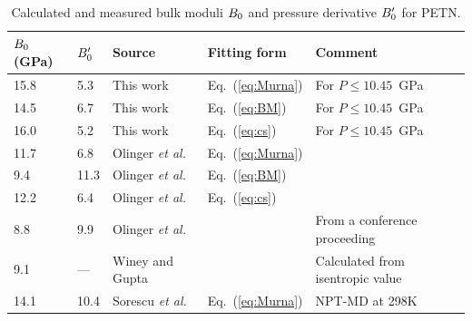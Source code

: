\documentclass[prb,aps,nobibnotes,twocolumn,doublespace,twocolumngrid,superbib]{revtex4}
\begin{document}
\begin{table}[p]
\begin{center}
\begin{tabular}{lllll}
\hline\hline
$B_0$(GPa) &   ${B'_0}$   &   Source  &    Fitting form &      Comment \\
\hline
15.8 & 5.3 & This work &  Eq.~(\ref{eq:Murna}) & For $P \le 10.45$~GPa \\
14.5 & 6.7 & This work & Eq.~(\ref{eq:BM}) & For $P \le 10.45$~GPa \\
16.0 & 5.2 & This work & Eq.~(\ref{eq:cs}) & For $P \le 10.45$~GPa \\
11.7 & 6.8 & Olinger {\it et al.}\cite{Olinger_1975v62} & Eq.~(\ref{eq:Murna}) \\
9.4 & 11.3 & Olinger {\it et al.}\cite{Olinger_1975v62} & Eq.~(\ref{eq:BM}) \\
12.2 & 6.4 & Olinger {\it et al.}\cite{Olinger_1975v62} & Eq.~(\ref{eq:cs}) \\
8.8 & 9.9 &   Olinger {\it et al.}\cite{Olinger_1976}&   &        From a conference proceeding\\
 9.1 & --- &   Winey and Gupta\cite{Winey_2001v90} &     & Calculated from isentropic value \\
14.1 &10.4 &Sorescu {\it et al.}\cite{Sorescu_1999v103} & Eq.~(\ref{eq:Murna})&         NPT-MD at 298K\\
\hline\hline
\end{tabular}
\end{center}
\caption{Calculated and measured bulk moduli $B_0$ and pressure
derivative ${B'_0}$ for PETN.
}
\label{tab:table3}
\end{table}
 
\end{document}
